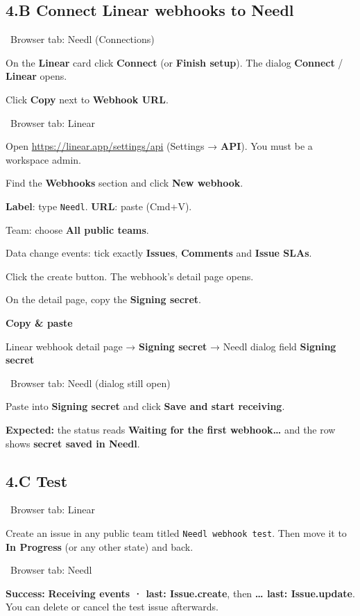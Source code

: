 \documentclass[11pt,a4paper]{article}
\newcommand{\ui}[1]{\textbf{#1}}
\newcommand{\where}[1]{\par\smallskip\noindent\colorbox{winbg}{\color{winfg}\bfseries\strut\ #1\ }\par\nopagebreak[4]}
\newcommand{\lit}[1]{\texttt{#1}}
\newenvironment{xfer}{\def\FrameCommand{\fboxsep=6pt\colorbox{xferbg}}\MakeFramed{\advance\hsize-\width\FrameRestore}\textbf{Copy \& paste}\par}{\endMakeFramed}
\begin{document}
\subsection*{4.B Connect Linear webhooks to Needl}
\where{Browser tab: Needl (Connections)}
\begin{steps}
\item On the \ui{Linear} card click \ui{Connect} (or \ui{Finish setup}). The dialog \ui{Connect} / \ui{Linear} opens.
\item Click \ui{Copy} next to \ui{Webhook URL}.
\end{steps}
\where{Browser tab: Linear}
\begin{steps}[resume]
\item Open \url{https://linear.app/settings/api} (Settings → \ui{API}). You must be a workspace admin.
\item Find the \ui{Webhooks} section and click \ui{New webhook}.
\item \ui{Label}: type \lit{Needl}. \ui{URL}: paste (Cmd+V).
\item Team: choose \ui{All public teams}.
\item Data change events: tick exactly \ui{Issues}, \ui{Comments} and \ui{Issue SLAs}.
\item Click the create button. The webhook's detail page opens.
\item On the detail page, copy the \ui{Signing secret}.
\end{steps}
\begin{xfer}
Linear webhook detail page → \ui{Signing secret} → Needl dialog field \ui{Signing secret}
\end{xfer}
\where{Browser tab: Needl (dialog still open)}
\begin{steps}[resume]
\item Paste into \ui{Signing secret} and click \ui{Save and start receiving}.
\item \textbf{Expected:} the status reads \ui{Waiting for the first webhook…} and the row shows \ui{secret saved in Needl}.
\end{steps}

\subsection*{4.C Test}
\where{Browser tab: Linear}
Create an issue in any public team titled \lit{Needl webhook test}. Then move it to \ui{In Progress} (or any other state) and back.
\where{Browser tab: Needl}
\textbf{Success:} \ui{Receiving events · last: Issue.create}, then \ui{… last: Issue.update}. You can delete or cancel the test issue afterwards.
\end{document}
